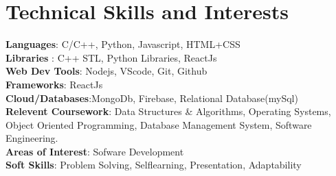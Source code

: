 \documentclass[a4paper,11pt]{article}
\begin{document}



\section{\textbf{Technical Skills and Interests}}
\begin{itemize}[leftmargin=0.05in, label={}]
  \small{\item{
        \textbf{Languages}{: C/C++, Python, Javascript, HTML+CSS } \\
        \textbf{Libraries }{: C++ STL, Python Libraries, ReactJs }\\
        \textbf{Web Dev Tools}{: Nodejs, VScode, Git, Github } \\
        \textbf{Frameworks}{: ReactJs } \\
        \textbf{Cloud/Databases}{:MongoDb, Firebase, Relational Database(mySql) } \\

        \textbf{Relevent Coursework}{: Data Structures \& Algorithms, Operating Systems, Object Oriented Programming, Database Management System, Software Engineering. } \\
        \textbf{Areas of Interest}{: Sofware Development} \\
        \textbf{Soft Skills}{: Problem Solving, Self\-learning, Presentation, Adaptability} \\
        }}
\end{itemize}
\vspace{-16pt}
\end{document}
